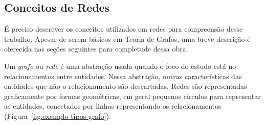 \documentclass[12pt,a4paper]{article}
\begin{document}
\subsection{Conceitos de Redes}

É preciso descrever os conceitos utilizados em redes para compreensão desse trabalho. Apesar de serem básicos em Teoria de Grafos, uma breve descrição é oferecida nas seções seguintes para completude dessa obra.

Um \textit{grafo} ou \textit{rede} é uma abstração usada quando o foco do estudo está no relacionamentos entre entidades. Nessa abstração, outras características das entidades que não o relacionamento são descartadas. Redes são representadas graficamente por formas geométricas, em geral pequenos círculos para representar as entidades, conectados por linhas representando os relacionamentos (Figura~\ref{fig:exemplo-tipos-grafo}).
\end{document}
